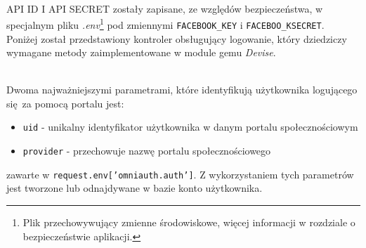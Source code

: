 \begin{code}
  
\end{code} \\

API ID I API SECRET zostały zapisane, ze względów bezpieczeństwa, w specjalnym pliku \emph{.env}\footnote{Plik przechowywujący zmienne środowiskowe, więcej informacji w rozdziale o bezpieczeństwie aplikacji.} pod zmiennymi \texttt{FACEBOOK\_KEY} i \texttt{FACEBOO\_KSECRET}. \\

Poniżej został przedstawiony kontroler obsługujący logowanie, który dziedziczy wymagane metody zaimplementowane w module gemu \emph{Devise}. \\

\begin{code}
  
\end{code} \\

\clearpage
Dwoma najważniejszymi parametrami, które identyfikują użytkownika logującego się za pomocą portalu jest:
\begin{itemize}
   \item \texttt{uid} - unikalny identyfikator użytkownika w danym portalu społecznościowym
   \item \texttt{provider} - przechowuje nazwę portalu społecznościowego
 \end{itemize}
zawarte w \texttt{request.env['omniauth.auth']}.
Z wykorzystaniem tych parametrów jest tworzone lub odnajdywane w bazie konto użytkownika. \\

\begin{code}
  
\end{code}
